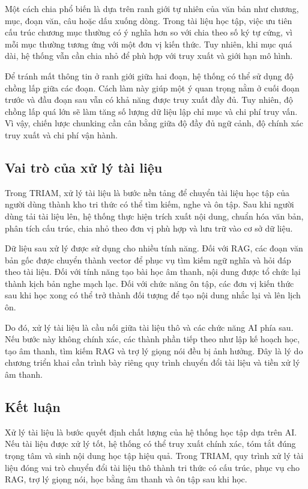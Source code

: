 \documentclass[12pt,a4paper]{report}
\begin{document}
Một cách chia phổ biến là dựa trên ranh giới tự nhiên của văn bản như chương, mục, đoạn văn, câu hoặc dấu xuống dòng. Trong tài liệu học tập, việc ưu tiên cấu trúc chương mục thường có ý nghĩa hơn so với chia theo số ký tự cứng, vì mỗi mục thường tương ứng với một đơn vị kiến thức. Tuy nhiên, khi mục quá dài, hệ thống vẫn cần chia nhỏ để phù hợp với truy xuất và giới hạn mô hình.

Để tránh mất thông tin ở ranh giới giữa hai đoạn, hệ thống có thể sử dụng độ chồng lấp giữa các đoạn. Cách làm này giúp một ý quan trọng nằm ở cuối đoạn trước và đầu đoạn sau vẫn có khả năng được truy xuất đầy đủ. Tuy nhiên, độ chồng lấp quá lớn sẽ làm tăng số lượng dữ liệu lập chỉ mục và chi phí truy vấn. Vì vậy, chiến lược chunking cần cân bằng giữa độ đầy đủ ngữ cảnh, độ chính xác truy xuất và chi phí vận hành.

\subsection{Vai trò của xử lý tài liệu}

Trong TRIAM, xử lý tài liệu là bước nền tảng để chuyển tài liệu học tập của người dùng thành kho tri thức có thể tìm kiếm, nghe và ôn tập. Sau khi người dùng tải tài liệu lên, hệ thống thực hiện trích xuất nội dung, chuẩn hóa văn bản, phân tích cấu trúc, chia nhỏ theo đơn vị phù hợp và lưu trữ vào cơ sở dữ liệu.

Dữ liệu sau xử lý được sử dụng cho nhiều tính năng. Đối với RAG, các đoạn văn bản gốc được chuyển thành vector để phục vụ tìm kiếm ngữ nghĩa và hỏi đáp theo tài liệu. Đối với tính năng tạo bài học âm thanh, nội dung được tổ chức lại thành kịch bản nghe mạch lạc. Đối với chức năng ôn tập, các đơn vị kiến thức sau khi học xong có thể trở thành đối tượng để tạo nội dung nhắc lại và lên lịch ôn.

Do đó, xử lý tài liệu là cầu nối giữa tài liệu thô và các chức năng AI phía sau. Nếu bước này không chính xác, các thành phần tiếp theo như lập kế hoạch học, tạo âm thanh, tìm kiếm RAG và trợ lý giọng nói đều bị ảnh hưởng. Đây là lý do chương triển khai cần trình bày riêng quy trình chuyển đổi tài liệu và tiền xử lý âm thanh.

\subsection{Kết luận}

Xử lý tài liệu là bước quyết định chất lượng của hệ thống học tập dựa trên AI. Nếu tài liệu được xử lý tốt, hệ thống có thể truy xuất chính xác, tóm tắt đúng trọng tâm và sinh nội dung học tập hiệu quả. Trong TRIAM, quy trình xử lý tài liệu đóng vai trò chuyển đổi tài liệu thô thành tri thức có cấu trúc, phục vụ cho RAG, trợ lý giọng nói, học bằng âm thanh và ôn tập sau khi học.
\end{document}
